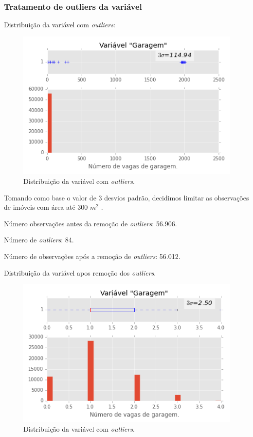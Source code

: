 \subsubsection{Tratamento de outliers da variável }





Distribuição da variável  com \textit{outliers}:
 
 
 \begin{figure}[H]
 	\centering
 	\includegraphics[width=0.8\linewidth]{img/var_garagem_boxhist_antes}
 	\caption{Distribuição da variável  com \textit{outliers}.}
 	\label{fig:var_garagem_boxhist_antes}
 \end{figure}
 
 Tomando como base o valor de 3 desvios padrão, decidimos limitar as observações de imóveis com área até 300 $ m^2 $ . 
 
 Número observações antes da remoção de \textit{outliers}: 56.906. 
 
 Número de \textit{outliers}: 84.
 
 Número de observações após a remoção de \textit{outliers}: 56.012.
 
 Distribuição da variável  apos remoção dos \textit{outliers}.
 
 \begin{figure}[H]
 	\centering
 	\includegraphics[width=0.8\linewidth]{img/var_garagem_boxhist_depois}
 	\caption{Distribuição da variável  com \textit{outliers}.}
 	\label{fig:var_garagem_boxhist_depois}
 \end{figure}
 
